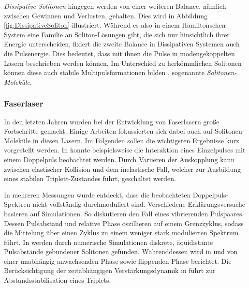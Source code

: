 \documentclass[bachelor,       %
               twoside,        %
               BCOR10mm,       %
               liststotoc,nomtotoc,bibtotoc, %
               english,ngerman, %
               final,          %
               ]{GAUBM}
\begin{document}
\textit{Dissipative Solitonen} hingegen werden von einer weiteren Balance, nämlich zwischen Gewinnen und Verlusten, gehalten.
Dies wird in Abbildung \ref{fig:DissipativeSoliton} illustriert.
Während es also in einem Hamiltonschen System eine Familie an Soliton-Lösungen gibt, die sich nur hinsichtlich ihrer Energie unterscheiden, fixiert die zweite Balance in Dissipativen Systemen auch die Pulsenergie.
Dies bedeutet, dass mit ihnen die Pulse in modengekoppelten Lasern \cite{grelu_dissipative_2012} beschrieben werden können.
Im Unterschied zu herkömmlichen Solitonen können diese auch stabile Multipulsformationen bilden \cite{ankiewicz_dissipative_2008}, sogenannte \textit{Solitonen-Moleküle}.

\subsubsection{Faserlaser}
In den letzten Jahren wurden bei der Entwicklung von Faserlasern große Fortschritte gemacht.
Einige Arbeiten fokussierten sich dabei auch auf Solitonen-Moleküle in diesen Lasern.
Im Folgenden sollen die wichtigsten Ergebnisse kurz vorgestellt werden.
In \cite{grelu_group_2004} konnte beispielsweise die Interaktion eines Einzelpulses mit einem Doppelpuls beobachtet werden.
Durch Variieren der Auskopplung kann zwischen elastischer Kollision und dem inelastische Fall, welcher zur Ausbildung eines stabilen Triplett-Zustandes führt, geschaltet werden. 

In mehreren Messungen wurde entdeckt, dass die beobachteten Doppelpuls-Spektren nicht vollständig durchmoduliert sind.
Verschiedene Erklärungsversuche basieren auf Simulationen. 
So diskutieren \cite{grapinet_vibrating_2006} den Fall eines vibrierenden Pulspaares.
Dessen Pulsabstand und relative Phase oszillieren auf einem Grenzzyklus, sodass die Mittelung über einen Zyklus zu einem weniger stark modulierten Spektrum führt.
In \cite{zavyalov_discrete_2009} werden durch numerische Simulationen diskrete, äquidistante Pulsabstände gebundener Solitonen gefunden.
Währenddessen wird in \cite{zavyalov_dissipative_2009} und \cite{ortac_observation_2010} von einer unabhängig anwachsenden Phase sowie flippenden Phase berichtet.
Die Berücksichtigung der zeitabhängigen Verstärkungsdynamik in \cite{zaviyalov_impact_2012} führt zur Abstandsstabilisation eines Triplets.

\end{document}
